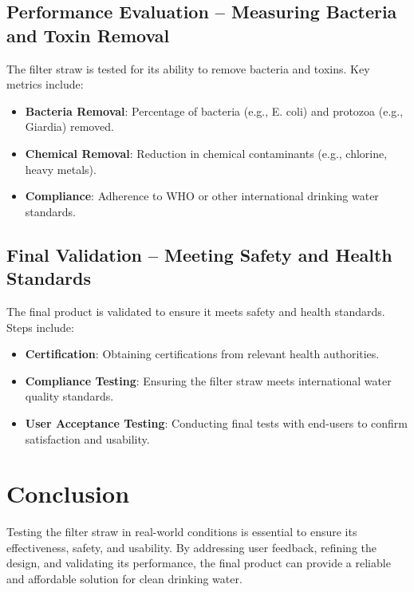 \documentclass{article}
\begin{document}
\vspace{0.5cm}

\subsection{Performance Evaluation – Measuring Bacteria and Toxin Removal}
The filter straw is tested for its ability to remove bacteria and toxins. Key metrics include:
\begin{itemize}
    \item \textbf{Bacteria Removal}: Percentage of bacteria (e.g., E. coli) and protozoa (e.g., Giardia) removed.
    \item \textbf{Chemical Removal}: Reduction in chemical contaminants (e.g., chlorine, heavy metals).
    \item \textbf{Compliance}: Adherence to WHO or other international drinking water standards.
\end{itemize}

\vspace{0.5cm}

\subsection{Final Validation – Meeting Safety and Health Standards}
The final product is validated to ensure it meets safety and health standards. Steps include:
\begin{itemize}
    \item \textbf{Certification}: Obtaining certifications from relevant health authorities.
    \item \textbf{Compliance Testing}: Ensuring the filter straw meets international water quality standards.
    \item \textbf{User Acceptance Testing}: Conducting final tests with end-users to confirm satisfaction and usability.
\end{itemize}

\vspace{0.5cm}

\section*{Conclusion}
Testing the filter straw in real-world conditions is essential to ensure its effectiveness, safety, and usability. By addressing user feedback, refining the design, and validating its performance, the final product can provide a reliable and affordable solution for clean drinking water.
\end{document}
